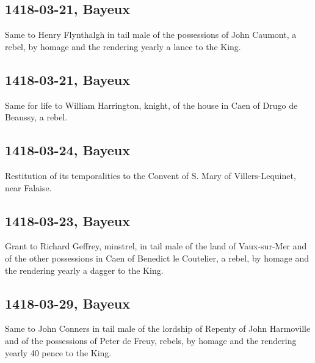 \documentclass[a4paper,12pt,twoside]{book}
\begin{document}
                
                \subsection{1418-03-21, Bayeux}
                
                
                  Same to Henry Flynthalgh in tail male of the possessions of John Caumont, a rebel, by homage and the rendering yearly a lance to the King.
               
                
                \subsection{1418-03-21, Bayeux}
                
                
                  Same for life to William Harrington, knight, of the house in Caen of Drugo de Beaussy, a rebel.
               
                
                \subsection{1418-03-24, Bayeux}
                
                
                  Restitution of its temporalities to the Convent of S. Mary of Villers-Lequinet, near Falaise.
               
                
                \subsection{1418-03-23, Bayeux}
                
                
                  Grant to Richard Geffrey, minstrel, in tail male of the land of Vaux-sur-Mer and of the other possessions in Caen of Benedict le Coutelier, a rebel, by homage and the rendering yearly a dagger to the King.
               
                
                \subsection{1418-03-29, Bayeux}
                
                
                  Same to John Conners in tail male of the lordship of Repenty of John Harmoville and of the possessions of Peter de Freuy, rebels, by homage and the rendering yearly 40 pence to the King.
               
\end{document}
